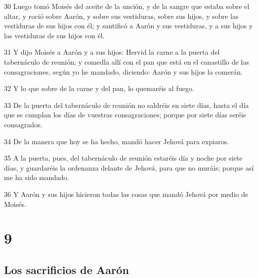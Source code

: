 \par 30 Luego tomó Moisés del aceite de la unción, y de la sangre que estaba sobre el altar, y roció sobre Aarón, y sobre sus vestiduras, sobre sus hijos, y sobre las vestiduras de sus hijos con él; y santificó a Aarón y sus vestiduras, y a sus hijos y las vestiduras de sus hijos con él.
\par 31 Y dijo Moisés a Aarón y a sus hijos: Hervid la carne a la puerta del tabernáculo de reunión; y comedla allí con el pan que está en el canastillo de las consagraciones, según yo he mandado, diciendo: Aarón y sus hijos la comerán.
\par 32 Y lo que sobre de la carne y del pan, lo quemaréis al fuego.
\par 33 De la puerta del tabernáculo de reunión no saldréis en siete días, hasta el día que se cumplan los días de vuestras consagraciones; porque por siete días seréis consagrados.
\par 34 De la manera que hoy se ha hecho, mandó hacer Jehová para expiaros.
\par 35 A la puerta, pues, del tabernáculo de reunión estaréis día y noche por siete días, y guardaréis la ordenanza delante de Jehová, para que no muráis; porque así me ha sido mandado.
\par 36 Y Aarón y sus hijos hicieron todas las cosas que mandó Jehová por medio de Moisés.

\chapter{9}

\section*{Los sacrificios de Aarón}

